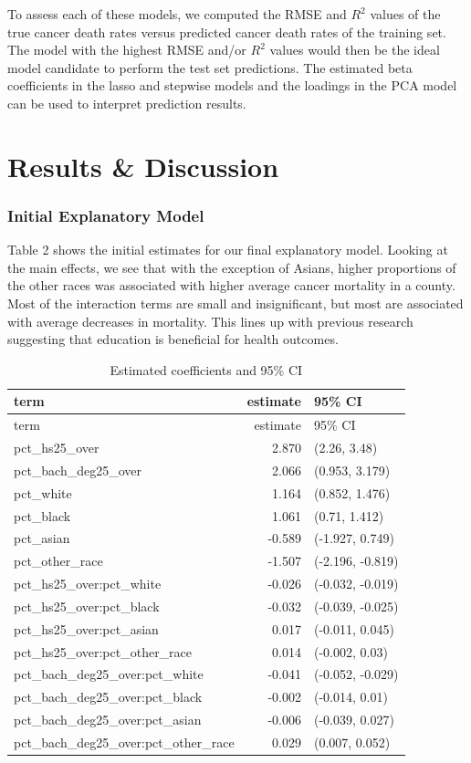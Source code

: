 \documentclass[
  11pt,
]{article}
\begin{document}
To assess each of these models, we computed the RMSE and \(R^2\) values
of the true cancer death rates versus predicted cancer death rates of
the training set. The model with the highest RMSE and/or \(R^2\) values
would then be the ideal model candidate to perform the test set
predictions. The estimated beta coefficients in the lasso and stepwise
models and the loadings in the PCA model can be used to interpret
prediction results.

\hypertarget{results-discussion}{%
\section{Results \& Discussion}\label{results-discussion}}

\hypertarget{initial-explanatory-model}{%
\subsubsection{Initial Explanatory
Model}\label{initial-explanatory-model}}

Table 2 shows the initial estimates for our final explanatory model.
Looking at the main effects, we see that with the exception of Asians,
higher proportions of the other races was associated with higher average
cancer mortality in a county. Most of the interaction terms are small
and insignificant, but most are associated with average decreases in
mortality. This lines up with previous research suggesting that
education is beneficial for health outcomes.

\begin{longtable}[]{@{}lrl@{}}
\caption{Estimated coefficients and 95\% CI}\tabularnewline
\toprule
term & estimate & 95\% CI\tabularnewline
\midrule
\endfirsthead
\toprule
term & estimate & 95\% CI\tabularnewline
\midrule
\endhead
pct\_hs25\_over & 2.870 & (2.26, 3.48)\tabularnewline
pct\_bach\_deg25\_over & 2.066 & (0.953, 3.179)\tabularnewline
pct\_white & 1.164 & (0.852, 1.476)\tabularnewline
pct\_black & 1.061 & (0.71, 1.412)\tabularnewline
pct\_asian & -0.589 & (-1.927, 0.749)\tabularnewline
pct\_other\_race & -1.507 & (-2.196, -0.819)\tabularnewline
pct\_hs25\_over:pct\_white & -0.026 & (-0.032, -0.019)\tabularnewline
pct\_hs25\_over:pct\_black & -0.032 & (-0.039, -0.025)\tabularnewline
pct\_hs25\_over:pct\_asian & 0.017 & (-0.011, 0.045)\tabularnewline
pct\_hs25\_over:pct\_other\_race & 0.014 & (-0.002, 0.03)\tabularnewline
pct\_bach\_deg25\_over:pct\_white & -0.041 & (-0.052,
-0.029)\tabularnewline
pct\_bach\_deg25\_over:pct\_black & -0.002 & (-0.014,
0.01)\tabularnewline
pct\_bach\_deg25\_over:pct\_asian & -0.006 & (-0.039,
0.027)\tabularnewline
pct\_bach\_deg25\_over:pct\_other\_race & 0.029 & (0.007,
0.052)\tabularnewline
\bottomrule
\end{longtable}
\end{document}
